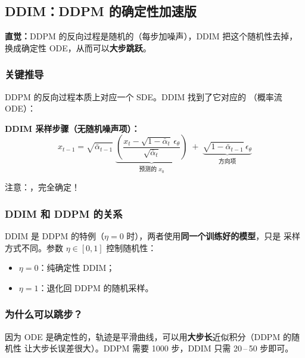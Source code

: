 \subsection{DDIM：DDPM 的确定性加速版}

\begin{intubox}
\textbf{直觉：}DDPM 的反向过程是随机的（每步加噪声），DDIM 把这个随机性去掉，
换成确定性 ODE，从而可以\textbf{大步跳跃}。
\end{intubox}

\subsubsection*{关键推导}

DDPM 的反向过程本质上对应一个 SDE。DDIM 找到了它对应的
（概率流 ODE）：

\begin{conceptbox}
\textbf{DDIM 采样步骤（无随机噪声项）：}
$$x_{t-1} = \sqrt{\bar{\alpha}_{t-1}}\;
  \underbrace{\left(
    \frac{x_t - \sqrt{1-\bar{\alpha}_t}\,\epsilon_\theta}{\sqrt{\bar{\alpha}_t}}
  \right)}_{\text{预测的 }x_0}
  \;+\;
  \underbrace{\sqrt{1-\bar{\alpha}_{t-1}}\,\epsilon_\theta}_{\text{方向项}}$$

注意：，完全确定！
\end{conceptbox}

\subsubsection*{DDIM 和 DDPM 的关系}

DDIM 是 DDPM 的特例（$\eta = 0$ 时），两者使用\textbf{同一个训练好的模型}，只是
采样方式不同。参数 $\eta \in [0, 1]$ 控制随机性：

\begin{itemize}
  \item $\eta = 0$：纯确定性 DDIM；
  \item $\eta = 1$：退化回 DDPM 的随机采样。
\end{itemize}

\subsubsection*{为什么可以跳步？}

\begin{intubox}
因为 ODE 是确定性的，轨迹是平滑曲线，可以用\textbf{大步长}近似积分（DDPM 的随机性
让大步长误差很大）。DDPM 需要 1000 步，DDIM 只需 20\,--\,50 步即可。
\end{intubox}

